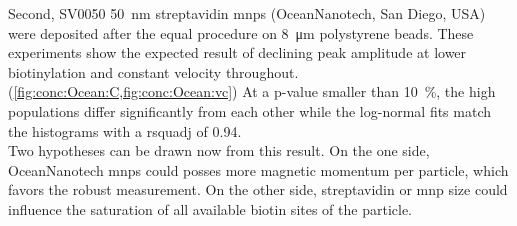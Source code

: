 Second, SV0050 \SI{50}{\nano\meter} streptavidin \glspl{mnp} (OceanNanotech, San Diego, USA) were deposited after the equal procedure on \SI{8}{\micro\meter} polystyrene beads. These experiments show the expected result of declining peak amplitude at lower biotinylation and constant velocity throughout. (\cref{fig:conc:Ocean:C,fig:conc:Ocean:vc}) At a p-value smaller than \SI{10}{\percent}, the high populations differ significantly from each other while the log-normal fits match the histograms with a \gls{rsquadj} of \num{0.94}.\\
Two hypotheses can be drawn now from this result. On the one side, OceanNanotech \glspl{mnp} could posses more magnetic momentum per particle, which favors the robust measurement. On the other side, streptavidin or \gls{mnp} size could influence the saturation of all available biotin sites of the particle. 




